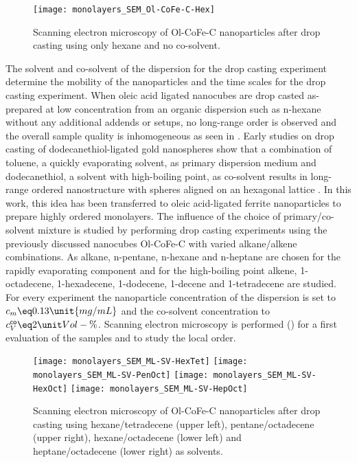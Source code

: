\documentclass[\main/dresen_thesis.tex]{subfiles}
\begin{document}
\begin{figure}[tb]
  \centering
  \texttt{[image: monolayers\_SEM\_Ol-CoFe-C-Hex]}
  \caption{\label{fig:monolayers:preparation:solventVariation:semNoCoSolvent}Scanning electron microscopy of Ol-CoFe-C nanoparticles after drop casting using only hexane and no co-solvent.}
\end{figure}
  The solvent and co-solvent of the dispersion for the drop casting experiment determine the mobility of the nanoparticles and the time scales for the drop casting experiment.
  When oleic acid ligated nanocubes are drop casted as-prepared at low concentration from an organic dispersion such as n-hexane without any additional addends or setups, no long-range order is observed and the overall sample quality is inhomogeneous as seen in .
  Early studies on drop casting of dodecanethiol-ligated gold nanospheres show that a combination of toluene, a quickly evaporating solvent, as primary dispersion medium and dodecanethiol, a solvent with high-boiling point, as co-solvent results in long-range ordered nanostructure with spheres aligned on an hexagonal lattice \cite{Bigioni_2006_Kinet}.
  In this work, this idea has been transferred to oleic acid-ligated ferrite nanoparticles to prepare highly ordered monolayers.
  The influence of the choice of primary/co-solvent mixture is studied by performing drop casting experiments using the previously discussed nanocubes Ol-CoFe-C with varied alkane/alkene combinations.
  As alkane, n-pentane, n-hexane and n-heptane are chosen for the rapidly evaporating component and for the high-boiling point alkene, 1-octadecene, 1-hexadecene, 1-dodecene, 1-decene and 1-tetradecene are studied.
  For every experiment the nanoparticle concentration of the dispersion is set to $c_m \eq 0.13 \unit{mg/mL}$ and the co-solvent concentration to $c_V^\textsf{co} \eq 2\unit{Vol-\%}$.
  Scanning electron microscopy is performed () for a first evaluation of the samples and to study the local order.

  \begin{figure}[tb]
    \centering
    \texttt{[image: monolayers\_SEM\_ML-SV-HexTet]}
    \texttt{[image: monolayers\_SEM\_ML-SV-PenOct]}
    \texttt{[image: monolayers\_SEM\_ML-SV-HexOct]}
    \texttt{[image: monolayers\_SEM\_ML-SV-HepOct]}
    \caption{\label{fig:monolayers:preparation:solventVariation:sem}Scanning electron microscopy of Ol-CoFe-C nanoparticles after drop casting using hexane/tetradecene (upper left),  pentane/octadecene (upper right), hexane/octadecene (lower left) and heptane/octadecene (lower right) as solvents.}
  \end{figure}
\end{document}
